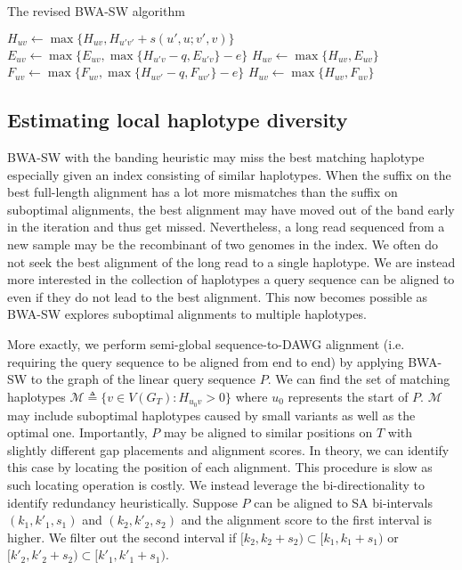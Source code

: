 \documentclass[webpdf,contemporary,large,namedate]{oup-authoring-template}%
\begin{document}
\begin{algorithm}[tb]
	\caption{The revised BWA-SW algorithm}\label{algo:bwa-sw}
	\begin{algorithmic}[1]
							\State $H_{uv}\gets \max\{H_{uv},H_{u'v'}+s(u',u;v',v)\}$
						\EndFor
					\EndFor
						\State $E_{uv}\gets\max\{E_{uv},\max\{H_{u'v}-q,E_{u'v}\}-e\}$
						\State $H_{uv}\gets\max\{H_{uv},E_{uv}\}$
					\EndFor
				\EndFor
						\State $F_{uv}\gets\max\{F_{uv},\max\{H_{uv'}-q,F_{uv'}\}-e\}$
						\State $H_{uv}\gets\max\{H_{uv},F_{uv}\}$
					\EndFor
				\EndFor
			\EndFor
		\EndProcedure
	\end{algorithmic}
\end{algorithm}

\subsection{Estimating local haplotype diversity}

BWA-SW with the banding heuristic may miss the best matching haplotype especially given an index consisting of similar haplotypes.
When the suffix on the best full-length alignment has a lot more mismatches than the suffix on suboptimal alignments,
the best alignment may have moved out of the band early in the iteration and thus get missed.
Nevertheless, a long read sequenced from a new sample may be the recombinant of two genomes in the index.
We often do not seek the best alignment of the long read to a single haplotype.
We are instead more interested in the collection of haplotypes a query sequence can be aligned to even if they do not lead to the best alignment.
This now becomes possible as BWA-SW explores suboptimal alignments to multiple haplotypes.

More exactly, we perform semi-global sequence-to-DAWG alignment (i.e. requiring the query sequence to be aligned from end to end)
by applying BWA-SW to the graph of the linear query sequence $P$.
We can find the set of matching haplotypes $\mathcal{M}\triangleq\{v\in V(G_T):H_{u_0v}>0\}$ where $u_0$ represents the start of $P$.
$\mathcal{M}$ may include suboptimal haplotypes caused by small variants as well as the optimal one.
Importantly, $P$ may be aligned to similar positions on $T$ with slightly different gap placements and alignment scores.
In theory, we can identify this case by locating the position of each alignment.
This procedure is slow as such locating operation is costly.
We instead leverage the bi-directionality to identify redundancy heuristically.
Suppose $P$ can be aligned to SA bi-intervals $(k_1,k'_1,s_1)$ and $(k_2,k'_2,s_2)$ and the alignment score to the first interval is higher.
We filter out the second interval if $[k_2,k_2+s_2)\subset[k_1,k_1+s_1)$ or $[k'_2,k'_2+s_2)\subset[k'_1,k'_1+s_1)$.
\end{document}
